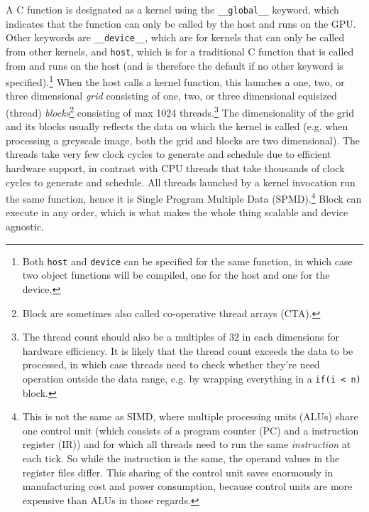 \documentclass[8pt, table, xcdraw]{article}%
\begin{document}
A C function is designated as a kernel using the \lstinline{__global__} keyword, which indicates that the function can only be called by the host and runs on the GPU. Other keywords are \lstinline{__device__}, which are for kernels that can only be called from other kernels, and \lstinline{host}, which is for a traditional C function that is called from and runs on the host (and is therefore the default if no other keyword is specified).\footnote{Both \lstinline{host} and \lstinline{device} can be specified for the same function, in which case two object functions will be compiled, one for the host and one for the device.}
When the host calls a kernel function, this launches a one, two, or three dimensional \emph{grid} consisting of one, two, or three dimensional equisized (thread) \emph{blocks}\footnote{Block are sometimes also called co-operative thread arrays (CTA).} consisting of max 1024 threads.\footnote{The thread count should also be a multiples of 32 in each dimensions for hardware efficiency. It is likely that the thread count exceeds the data to be processed, in which case threads need to check whether they're need operation outside the data range, e.g. by wrapping everything in a \lstinline{if(i < n)} block.} The dimensionality of the grid and its blocks usually reflects the data on which the kernel is called (e.g. when processing a greyscale image, both the grid and blocks are two dimensional). The threads take very few clock cycles to generate and schedule due to efficient hardware support, in contrast with CPU threads that take thousands of clock cycles to generate and schedule. All threads launched by a kernel invocation run the same function, hence it is Single Program Multiple Data (SPMD).\footnote{This is not the same as SIMD, where multiple processing units (ALUs) share one control unit (which consists of a program counter (PC) and a instruction register (IR)) and for which all threads need to run the same \textit{instruction} at each tick. So while the instruction is the same, the operand values in the register files differ. This sharing of the control unit saves enormously in manufacturing cost and power consumption, because control units are more expensive than ALUs in those regards.} Block can execute in any order, which is what makes the whole thing scalable and device agnostic.\\
\end{document}
